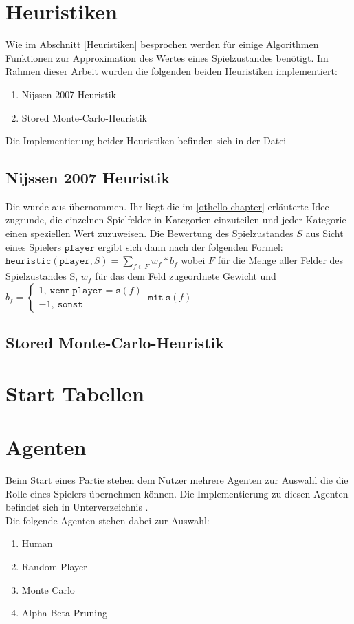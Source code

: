 \section{Heuristiken}
Wie im Abschnitt \ref{Heuristiken} besprochen werden für einige Algorithmen Funktionen zur Approximation des Wertes eines Spielzustandes benötigt. Im Rahmen dieser Arbeit wurden die folgenden beiden Heuristiken implementiert:
\begin{enumerate}
\item Nijssen 2007 Heuristik
\item Stored Monte-Carlo-Heuristik
\end{enumerate}
Die Implementierung beider Heuristiken befinden sich in der Datei 
\subsection{Nijssen 2007 Heuristik}
Die  wurde aus \cite{nijssen_2007} übernommen. Ihr liegt die im \ref{othello-chapter} erläuterte Idee zugrunde, die einzelnen Spielfelder in Kategorien einzuteilen und jeder Kategorie einen speziellen Wert zuzuweisen. Die Bewertung des Spielzustandes $S$ aus Sicht eines Spielers $\mathtt{player}$ ergibt sich dann nach der folgenden Formel: $\mathtt{heuristic}(\mathtt{player}, S) = \sum\limits_{f \in F}  w_{f} * b_{f}$ wobei $F$ für die Menge aller Felder des Spielzustandes S, $w_{f}$ für das dem Feld zugeordnete Gewicht und $b_{f} = \begin{cases} 1 \mathtt{,\ wenn\ player} = \mathtt{s}(f) \\ -1 \mathtt{,\ sonst} \end{cases} \ \mathtt{mit\ s}(f) $
\subsection{Stored Monte-Carlo-Heuristik}
\section{Start Tabellen}
\section{Agenten}
\label{agenten}
Beim Start eines Partie stehen dem Nutzer mehrere Agenten zur Auswahl die die Rolle eines Spielers übernehmen können. Die Implementierung zu diesen Agenten befindet sich in Unterverzeichnis .
\\Die folgende Agenten stehen dabei zur Auswahl:
\begin{enumerate}
\item Human
\item Random Player
\item Monte Carlo
\item Alpha-Beta Pruning
\end{enumerate}

